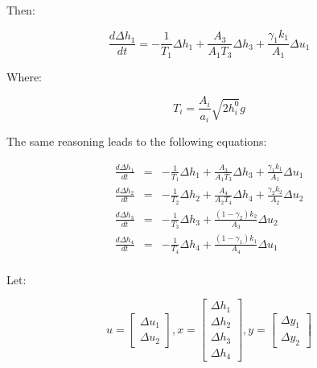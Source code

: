 Then:

$$
    \frac{d\Delta h_1}{dt} =
    - \frac{1}{T_1}\Delta h_1
    + \frac{A_3}{A_1T_3}\Delta h_3
    + \frac{\gamma_1k_1}{A_1}\Delta u_1 
$$

Where: 

$$T_i = \frac{A_i}{a_i}\sqrt{2h_i^0}{g}$$

The same reasoning leads to the following equations:

$$
\begin{array}{rcl}
    \frac{d\Delta h_1}{dt} & = &
    - \frac{1}{T_1}\Delta h_1
    + \frac{A_3}{A_1T_3}\Delta h_3
    + \frac{\gamma_1k_1}{A_1}\Delta u_1 \\

    \frac{d\Delta h_2}{dt} & = &
    - \frac{1}{T_2}\Delta h_2
    + \frac{A_4}{A_2T_4}\Delta h_4
    + \frac{\gamma_2k_2}{A_2}\Delta u_2 \\
    
    \frac{d\Delta h_3}{dt} & = &
    - \frac{1}{T_3}\Delta h_3
    + \frac{(1-\gamma_2)k_2}{A_3}\Delta u_2 \\
    
    \frac{d\Delta h_4}{dt} & = &
    - \frac{1}{T_4}\Delta h_4
    + \frac{(1-\gamma_1)k_1}{A_4}\Delta u_1 \\
\end{array}
$$

Let:

$$
u = \left[\begin{array}{c} \Delta u_1 \\ \Delta u_2 \end{array} \right],
x = \left[\begin{array}{c} \Delta h_1 \\ \Delta h_2 \\ \Delta h_3 \\ \Delta h_4  \end{array} \right],
y = \left[\begin{array}{c} \Delta y_1 \\ \Delta y_2 \end{array} \right]
$$

